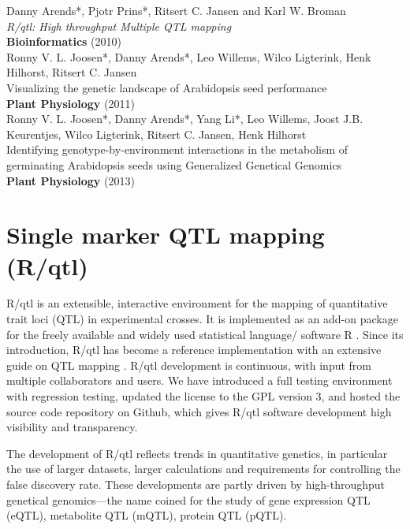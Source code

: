 \documentclass[8pt, twoside, a5paper]{report}
\newenvironment{myexampleblock}[1]{%
    \tcolorbox[beamer,%
    noparskip,breakable,
    colback=LightGreen,colframe=DarkGreen,%
    colbacklower=LimeGreen!75!LightGreen,%
    title=#1]}%
    {\endtcolorbox}
\newcommand{\authors}[1]{\small{#1}}
\newcommand{\bold}[1]{{\bfseries #1}}
\begin{document}
\begin{myexampleblock}{Originally published as:}
  \authors{Danny Arends*, Pjotr Prins*, Ritsert C. Jansen and Karl W. Broman}\\
  \emph{R/qtl: High throughput Multiple QTL mapping}\\
  \bold{Bioinformatics} (2010) \\

  \authors{Ronny V. L. Joosen*, Danny Arends*, Leo Willems, Wilco Ligterink, Henk Hilhorst, Ritsert C. Jansen}\\
  Visualizing the genetic landscape of Arabidopsis seed performance\\
  \bold{Plant Physiology} (2011)\\

  \authors{Ronny V. L. Joosen*, Danny Arends*, Yang Li*, Leo Willems, Joost J.B. Keurentjes, Wilco Ligterink, 
  Ritsert C. Jansen, Henk Hilhorst}\\
  Identifying genotype-by-environment interactions in the metabolism of germinating Arabidopsis seeds using 
  Generalized Genetical Genomics\\
  \bold{Plant Physiology} (2013)
\end{myexampleblock}

\newpage

\section{Single marker QTL mapping (R/qtl)}

R/qtl is an extensible, interactive environment for the mapping of quantitative trait loci (QTL) in experimental 
crosses. It is implemented as an add-on package for the freely available and widely used statistical language/
software R \cite{R:2009}. Since its introduction, R/qtl \cite{Broman:2003} has become a
reference implementation with an extensive guide on QTL mapping \cite{RQTLGuide:2009}. R/qtl development is 
continuous, with input from multiple collaborators and users.  We have introduced a full testing environment with 
regression testing, updated the license to the GPL version 3, and hosted the source code repository on Github,
which gives R/qtl software development high visibility and transparency. 

The development of R/qtl reflects trends in quantitative genetics, in particular the use of larger datasets, larger 
calculations and requirements for controlling the false discovery rate. These developments are partly driven by 
high-throughput genetical genomics---the name coined for the study of gene expression QTL (eQTL)\cite{Jansen:2001a}, 
metabolite QTL (mQTL), protein QTL (pQTL).
\end{document}
